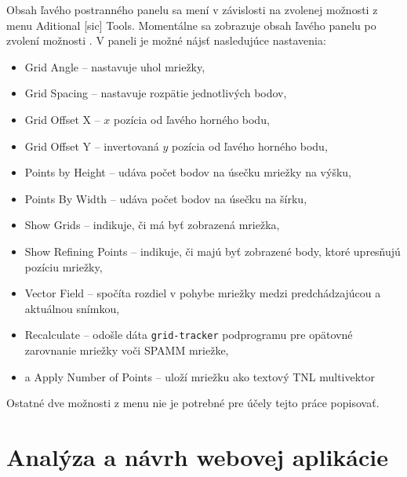 {Obsah ľavého postranného panelu sa mení v závislosti na zvolenej možnosti z menu Aditional [sic] Tools. Momentálne sa zobrazuje obsah ľavého panelu po zvolení možnosti . V paneli je možné nájsť nasledujúce nastavenia:

\begin {itemize}
\item {Grid Angle -- nastavuje uhol mriežky,}
\item {Grid Spacing -- nastavuje rozpätie jednotlivých bodov,}
\item {Grid Offset X -- $x$ pozícia od ľavého horného bodu,}
\item {Grid Offset Y -- invertovaná $y$ pozícia od ľavého horného bodu,}
\item {Points by Height -- udáva počet bodov na úsečku mriežky na výšku,}
\item {Points By Width -- udáva počet bodov na úsečku na šírku,}
\item {Show Grids -- indikuje, či má byť zobrazená mriežka,}
\item {Show Refining Points -- indikuje, či majú byť zobrazené body, ktoré upresňujú pozíciu mriežky,}
\item {Vector Field -- spočíta rozdiel v pohybe mriežky medzi predchádzajúcou a aktuálnou snímkou,}
\item {Recalculate -- odošle dáta \texttt{grid-tracker} podprogramu pre opätovné zarovnanie mriežky voči SPAMM mriežke,}
\item {a Apply Number of Points -- uloží mriežku ako textový TNL multivektor}
\end {itemize}

Ostatné dve možnosti z menu  nie je potrebné pre účely tejto práce popisovať.


\chapter {Analýza a návrh webovej aplikácie}

}
